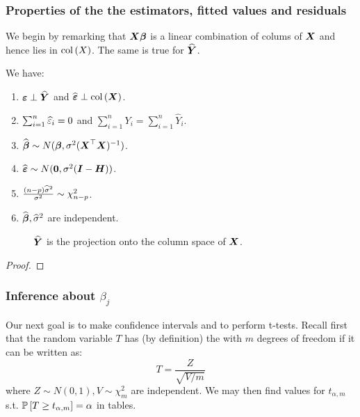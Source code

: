 \subsubsection{Properties of the the estimators, fitted values and residuals}
We begin by remarking that $\boldsymbol{X}\boldsymbol{\beta}$ is a linear combination of colums of $\boldsymbol{X}$ and hence lies in $\mathrm{col}\left(X\right)$. The same is true for $\widehat{\boldsymbol{Y}}$. 
\begin{proposition}
    We have:
    \begin{enumerate}
        \item $\boldsymbol{\varepsilon}\perp\widehat{\boldsymbol{Y}}$ and $\widehat{\boldsymbol{\varepsilon}}\perp\mathrm{col}\left(\boldsymbol{X}\right)$.
        \item $\sum_{i=1}^n \widehat{\varepsilon}_i = 0$ and $\sum_{i=1}^n Y_i = \sum_{i=1}^n \hat{Y}_i$.
        \item $\widehat{\boldsymbol{\beta}} \sim N(\boldsymbol{\beta}, \sigma^2(\boldsymbol{X}^\top\boldsymbol{X})^{-1})$.
        \item $\widehat{\boldsymbol{\varepsilon}} \sim N(\boldsymbol{0}, \sigma^2(\boldsymbol{I}-\boldsymbol{H}))$.
        \item $\frac{(n-p)\widehat{\sigma}^2}{\sigma^2} \sim \chi^2_{n-p}$.
        \item $\widehat{\boldsymbol{\beta}}, \widehat{\sigma}^2$ are independent.
    \end{enumerate}
\end{proposition}

\begin{figure}[H] \centering
    \caption{$\widehat{\boldsymbol{Y}}$ is the projection onto the column space of $\boldsymbol{X}$.}   
\end{figure}

\begin{proof}
\end{proof}

\subsubsection{Inference about $\beta_j$}
Our next goal is to make confidence intervals and to perform t-tests. Recall first that the random variable $T$ has (by definition) the  with $m$ degrees of freedom if it can be written as:
$$
    T = \frac{Z}{\sqrt{V/m}}
$$
where $Z\sim N(0,1), V\sim\chi^2_m$ are independent. We may then find values for $t_{\alpha, m}$ s.t. $\mathbb{P}\left[T\geq t_{\alpha, m}\right]=\alpha$ in tables. 

